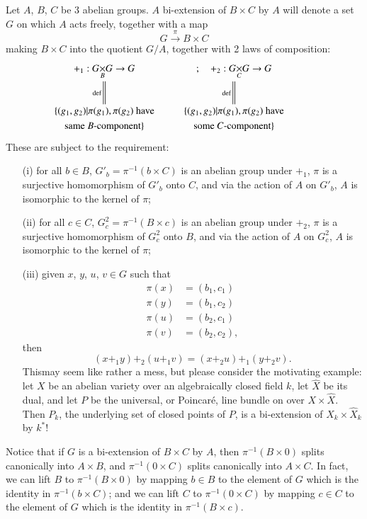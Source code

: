 Let $A$, $B$, $C$ be 3 abelian groups. $A$ bi-extension of $B\times C$ by $A$ will denote a set $G$ on which $A$ acts freely, together with a map
$$
G\xrightarrow{\pi} B\times C
$$
making $B\times C$ into the quotient $G/A$, together with 2 laws of composition:
\[
\xymatrix@R=.01cm{
+_{1}:\fprod{G}{G}{B}\to G\ar@{=}[ddddd]_-{\text{def}} & ;\quad +_{2}:\fprod{G}{G}{C}\to G\ar@{=}[ddddd]_-{\text{def}}\\
 & & \\
 & & \\
 & & \\
 & & \\
\{(g_{1},g_{2})|\pi(g_{1}),\pi(g_{2})\text{~have}  & \{(g_{1},g_{2})|\pi(g_{1}),\pi(g_{2})\text{~have}\\
\text{same $B$-component}\} & \text{some $C$-component}\}
}
\]
These are subject to the requirement:
\begin{itemize}
\item[(i)] for all $b\in B$, $G'_{b}=\pi^{-1}(b\times C)$ is an abelian group under $+_{1}$, $\pi$ is a surjective homomorphism of $G'_{b}$ onto $C$, and via the action of $A$ on $G'_{b}$, $A$ is isomorphic to the kernel of $\pi$;

\item[(ii)] for all $c\in C$, $G^{2}_{c}=\pi^{-1}(B\times c)$ is an abelian group under $+_{2}$, $\pi$ is a surjective homomorphism of $G^{2}_{c}$ onto $B$, and via the action of $A$ on $G^{2}_{c}$, $A$ is isomorphic to the kernel of $\pi$;

\item[(iii)] given $x$, $y$, $u$, $v\in G$ such that
\begin{align*}
\pi(x) &= (b_{1},c_{1})\\
\pi(y) &= (b_{1},c_{2})\\
\pi(u) &= (b_{2},c_{1})\\
\pi(v) &= (b_{2},c_{2}),
\end{align*}
then 
$$
(x+_{1}y)+_{2}(u+_{1}v)=(x+_{2}u)+_{1}(y+_{2}v).
$$
This\pageoriginale may seem like rather a mess, but please consider the motivating example: let $X$ be an abelian variety over an algebraically closed field $k$, let $\widehat{X}$ be its dual, and let $P$ be the universal, or Poincar\'e, line bundle on over $X\times \widehat{X}$. Then $P_{k}$, the underlying set of closed points of $P$, is a bi-extension of $X_{k}\times \widehat{X}_{k}$ by $k^{*}$!
\end{itemize}

Notice that if $G$ is a bi-extension of $B\times C$ by $A$, then $\pi^{-1}(B\times 0)$ splits canonically into $A\times B$, and $\pi^{-1}(0\times C)$ splits canonically into $A\times C$. In fact, we can lift $B$ to $\pi^{-1}(B\times 0)$ by mapping $b\in B$ to the element of $G$ which is the identity in $\pi^{-1}(b\times C)$; and we can lift $C$ to $\pi^{-1}(0\times C)$ by mapping $c\in C$ to the element of $G$ which is the identity in $\pi^{-1}(B\times c)$.

